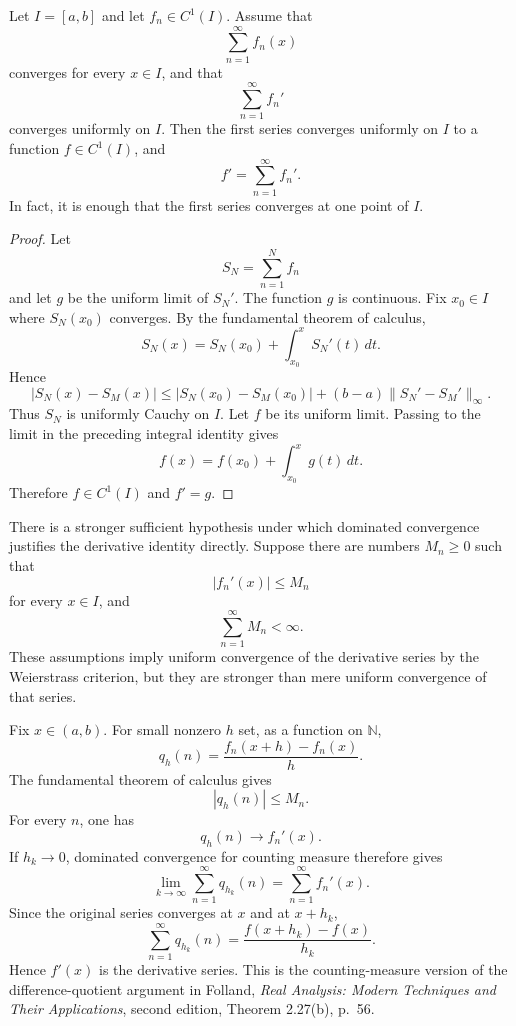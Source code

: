 \begin{theorem}
\label{theorem-differentiating-series}
Let $I=[a,b]$ and let $f_n\in C^1(I)$.
Assume that
$$
\sum_{n=1}^{\infty}f_n(x)
$$
converges for every $x\in I$, and that
$$
\sum_{n=1}^{\infty}f_n'
$$
converges uniformly on $I$. Then the first
series converges uniformly on $I$ to a
function $f\in C^1(I)$, and
$$
f'=\sum_{n=1}^{\infty}f_n'.
$$
In fact, it is enough that the first series
converges at one point of $I$.
\end{theorem}

\begin{proof}
Let
$$
S_N=\sum_{n=1}^N f_n
$$
and let $g$ be the uniform limit of $S_N'$.
The function $g$ is continuous. Fix
$x_0\in I$ where $S_N(x_0)$ converges. By
the fundamental theorem of calculus,
$$
S_N(x)=S_N(x_0)
+\int_{x_0}^x S_N'(t)\,dt.
$$
Hence
$$
|S_N(x)-S_M(x)|
\leq |S_N(x_0)-S_M(x_0)|
+(b-a)\|S_N'-S_M'\|_\infty.
$$
Thus $S_N$ is uniformly Cauchy on $I$.
Let $f$ be its uniform limit. Passing to the
limit in the preceding integral identity
gives
$$
f(x)=f(x_0)+\int_{x_0}^x g(t)\,dt.
$$
Therefore $f\in C^1(I)$ and $f'=g$.
\end{proof}

\begin{remark}
\label{remark-differentiating-series-dct}
There is a stronger sufficient hypothesis
under which dominated convergence justifies
the derivative identity directly. Suppose
there are
numbers $M_n\geq0$ such that
$$
|f_n'(x)|\leq M_n
$$
for every $x\in I$, and
$$
\sum_{n=1}^{\infty}M_n<\infty.
$$
These assumptions imply uniform convergence
of the derivative series by the Weierstrass
criterion, but they are stronger than mere
uniform convergence of that series.

Fix $x\in(a,b)$. For small nonzero $h$ set,
as a function on $\mathbb{N}$,
$$
q_h(n)=
\frac{f_n(x+h)-f_n(x)}{h}.
$$
The fundamental theorem of calculus gives
$$
|q_h(n)|\leq M_n.
$$
For every $n$, one has
$$
q_h(n)\longrightarrow f_n'(x).
$$
If $h_k\to0$, dominated convergence for
counting measure therefore gives
$$
\lim_{k\to\infty}
\sum_{n=1}^{\infty}q_{h_k}(n)
=
\sum_{n=1}^{\infty}f_n'(x).
$$
Since the original series converges at
$x$ and at $x+h_k$,
$$
\sum_{n=1}^{\infty}q_{h_k}(n)
=
\frac{f(x+h_k)-f(x)}{h_k}.
$$
Hence $f'(x)$ is the derivative series.
This is the counting-measure version of the
difference-quotient argument in Folland,
{\it Real Analysis: Modern Techniques and
Their Applications}, second edition,
Theorem 2.27(b), p.~56.
\end{remark}

